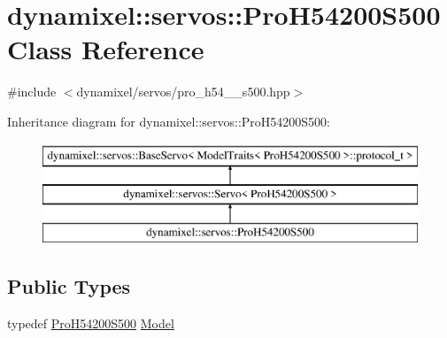 \hypertarget{classdynamixel_1_1servos_1_1_pro_h54200_s500}{}\section{dynamixel\+:\+:servos\+:\+:Pro\+H54200\+S500 Class Reference}
\label{classdynamixel_1_1servos_1_1_pro_h54200_s500}


{\ttfamily \#include $<$dynamixel/servos/pro\+\_\+h54\+\_\+\_\+s500.\+hpp$>$}

Inheritance diagram for dynamixel\+:\+:servos\+:\+:Pro\+H54200\+S500\+:\begin{figure}[H]
\begin{center}
\leavevmode
\includegraphics[height=3.000000cm]{classdynamixel_1_1servos_1_1_pro_h54200_s500}
\end{center}
\end{figure}
\subsection*{Public Types}
\begin{DoxyCompactItemize}
\item 
typedef \hyperlink{classdynamixel_1_1servos_1_1_pro_h54200_s500}{Pro\+H54200\+S500} \hyperlink{classdynamixel_1_1servos_1_1_pro_h54200_s500_a7f33accccf068b3c2df96fb903cd058f}{Model}
\end{DoxyCompactItemize}
